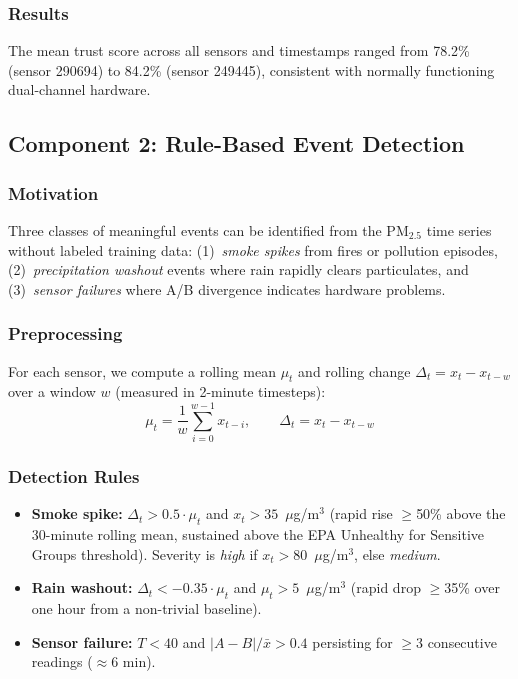 \documentclass[11pt, letterpaper]{article}
\begin{document}
\subsubsection{Results}

The mean trust score across all sensors and timestamps ranged from
78.2\% (sensor 290694) to 84.2\% (sensor 249445), consistent with
normally functioning dual-channel hardware.


\subsection{Component 2: Rule-Based Event Detection}

\subsubsection{Motivation}

Three classes of meaningful events can be identified from the PM$_{2.5}$ time
series without labeled training data: (1)~\textit{smoke spikes} from fires or
pollution episodes, (2)~\textit{precipitation washout} events where rain rapidly
clears particulates, and (3)~\textit{sensor failures} where A/B divergence
indicates hardware problems.

\subsubsection{Preprocessing}

For each sensor, we compute a rolling mean $\mu_t$ and rolling change
$\Delta_t = x_t - x_{t-w}$ over a window $w$ (measured in 2-minute timesteps):
\[
  \mu_t = \frac{1}{w}\sum_{i=0}^{w-1} x_{t-i}, \qquad
  \Delta_t = x_t - x_{t-w}
\]

\subsubsection{Detection Rules}

\begin{itemize}[noitemsep]
  \item \textbf{Smoke spike:} $\Delta_t > 0.5 \cdot \mu_t$ and $x_t > 35$~$\mu$g/m$^3$
        (rapid rise $\geq$50\% above the 30-minute rolling mean, sustained above
        the EPA Unhealthy for Sensitive Groups threshold). Severity is \textit{high}
        if $x_t > 80$~$\mu$g/m$^3$, else \textit{medium}.
  \item \textbf{Rain washout:} $\Delta_t < -0.35 \cdot \mu_t$ and $\mu_t > 5$~$\mu$g/m$^3$
        (rapid drop $\geq$35\% over one hour from a non-trivial baseline).
  \item \textbf{Sensor failure:} $T < 40$ and $|A-B|/\bar{x} > 0.4$
        persisting for $\geq$3 consecutive readings ($\approx$6 min).
\end{itemize}
\end{document}
